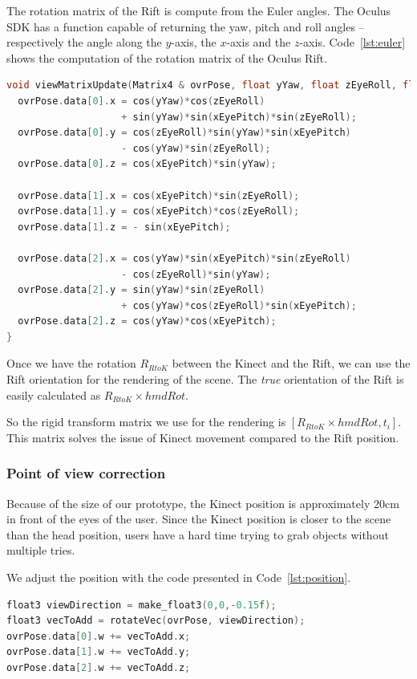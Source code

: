 \documentclass[12pt, twoside]{article}
\begin{document}
The rotation matrix of the Rift is compute from the Euler angles. The Oculus SDK has a function capable of returning the yaw, pitch and roll angles -- respectively the angle along the $y$-axis, the $x$-axis and the $z$-axis. Code~\ref{lst:euler} shows the computation of the rotation matrix of the Oculus Rift.

\begin{lstlisting}[language=C++, caption={C++ code for computing the rotation matrix of the Rift}, label={lst:euler}]
void viewMatrixUpdate(Matrix4 & ovrPose, float yYaw, float zEyeRoll, float xEyePitch){
  ovrPose.data[0].x = cos(yYaw)*cos(zEyeRoll)
                    + sin(yYaw)*sin(xEyePitch)*sin(zEyeRoll);
  ovrPose.data[0].y = cos(zEyeRoll)*sin(yYaw)*sin(xEyePitch)
                    - cos(yYaw)*sin(zEyeRoll);
  ovrPose.data[0].z = cos(xEyePitch)*sin(yYaw);
        
  ovrPose.data[1].x = cos(xEyePitch)*sin(zEyeRoll);
  ovrPose.data[1].y = cos(xEyePitch)*cos(zEyeRoll);
  ovrPose.data[1].z = - sin(xEyePitch);
        
  ovrPose.data[2].x = cos(yYaw)*sin(xEyePitch)*sin(zEyeRoll)
                    - cos(zEyeRoll)*sin(yYaw);
  ovrPose.data[2].y = sin(yYaw)*sin(zEyeRoll)
                    + cos(yYaw)*cos(zEyeRoll)*sin(xEyePitch);
  ovrPose.data[2].z = cos(yYaw)*cos(xEyePitch);
}
\end{lstlisting}

Once we have the rotation $R_{RtoK}$ between the Kinect and the Rift, we can use the Rift orientation for the rendering of the scene. The \textit{true} orientation of the Rift is easily calculated as $R_{RtoK}\times hmdRot$.

So the rigid transform matrix we use for the rendering is $[R_{RtoK}\times hmdRot,t_i]$. This matrix solves the issue of Kinect movement compared to the Rift position.

\subsubsection{Point of view correction}

Because of the size of our prototype, the Kinect position is approximately 20cm in front of the eyes of the user. Since the Kinect position is closer to the scene than the head position, users have a hard time trying to grab objects without multiple tries.

We adjust the position with the code presented in Code~\ref{lst:position}.

\begin{lstlisting}[language=C++, caption={C++ code for adjusting the position of the user}, label={lst:position}]
float3 viewDirection = make_float3(0,0,-0.15f);
float3 vecToAdd = rotateVec(ovrPose, viewDirection);
ovrPose.data[0].w += vecToAdd.x;
ovrPose.data[1].w += vecToAdd.y;
ovrPose.data[2].w += vecToAdd.z;
\end{lstlisting}
\end{document}
